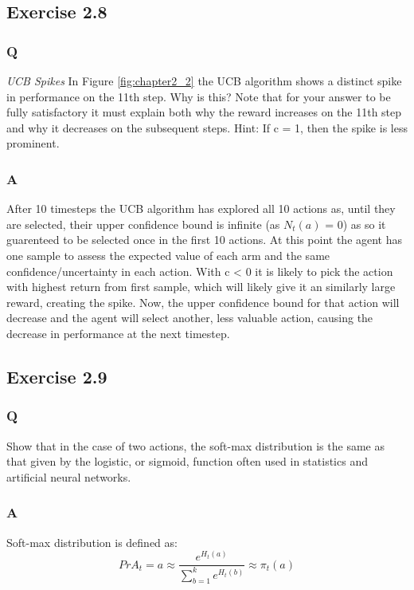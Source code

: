 \subsection{Exercise 2.8}
\subsubsection*{Q}
\textit{UCB Spikes} In Figure \ref{fig:chapter2_2} the UCB algorithm shows a distinct spike in performance on the 11th step. Why is this? Note that for your answer to be fully satisfactory it must explain both why the reward increases on the 11th step and why it decreases on the subsequent steps. Hint: If c = 1, then the spike is less prominent.

\subsubsection*{A}
After 10 timesteps the UCB algorithm has explored all 10 actions as, until they are selected, their upper confidence bound is infinite (as \(N_t(a)\) = 0) as so it guarenteed to be selected once in the first 10 actions. At this point the agent has one sample to assess the expected value of each arm and the same confidence/uncertainty in each action. With c < 0 it is likely to pick the action with highest return from first sample, which will likely give it an similarly large reward, creating the spike. Now, the upper confidence bound for that action will decrease and the agent will select another, less valuable action, causing the decrease in performance at the next timestep.
\subsection{Exercise 2.9}
\subsubsection*{Q}
Show that in the case of two actions, the soft-max distribution is the same as that given by the logistic, or sigmoid, function often used in statistics and artificial neural networks.

\subsubsection*{A}
Soft-max distribution is defined as:
\begin{equation}
	Pr{A_t = a} \approx \frac{e^{H_t(a)}}{\sum_{b=1}^{k} e^{H_t(b)}} \approx \pi_t(a)
\end{equation}

